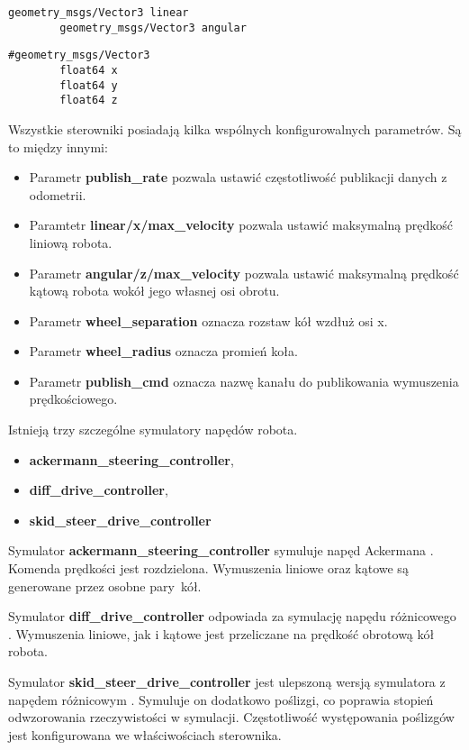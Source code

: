 {{    \vspace{2mm}
    
    \begin{lstlisting}[caption=Format wiadomości wymuszenia prędkościowego]
        geometry_msgs/Vector3 linear
        geometry_msgs/Vector3 angular
    \end{lstlisting}
    
    \begin{lstlisting}[caption=Format wiadomości definiującej wektor]
        #geometry_msgs/Vector3
        float64 x
        float64 y
        float64 z
    \end{lstlisting}
    
    Wszystkie sterowniki posiadają kilka wspólnych konfigurowalnych parametrów. Są to między innymi:
    \begin{itemize}
            \item Parametr \textbf{publish\_rate} pozwala ustawić częstotliwość publikacji danych z odometrii.
            \item Paramtetr \textbf{linear/x/max\_velocity} pozwala ustawić maksymalną prędkość liniową robota.
            \item Parametr \textbf{angular/z/max\_velocity} pozwala ustawić maksymalną prędkość kątową robota wokół jego własnej osi obrotu.
            \item Parametr \textbf{wheel\_separation} oznacza rozstaw kół wzdłuż osi x.
            \item Parametr \textbf{wheel\_radius} oznacza promień koła.
            \item Parametr \textbf{publish\_cmd} oznacza nazwę kanału do publikowania wymuszenia prędkościowego.
        \end{itemize}
    
    Istnieją trzy szczególne symulatory napędów robota.
    \begin{itemize}
            \item \textbf{ackermann\_steering\_controller},
            \item \textbf{diff\_drive\_controller},
            \item \textbf{skid\_steer\_drive\_controller}
    \end{itemize}
    
    Symulator \textbf{ackermann\_steering\_controller} symuluje napęd Ackermana \cite{ackermann_steering_controller}. Komenda prędkości jest rozdzielona. Wymuszenia liniowe oraz kątowe są generowane przez osobne pary~kół.

    Symulator \textbf{diff\_drive\_controller} odpowiada za symulację napędu różnicowego \cite{diff_steering}. Wymuszenia liniowe, jak i kątowe jest przeliczane na prędkość obrotową kół robota.
    
    Symulator \textbf{skid\_steer\_drive\_controller} jest ulepszoną wersją symulatora z napędem różnicowym \cite{skid_steer_drive_controller}. Symuluje on dodatkowo poślizgi, co poprawia stopień odwzorowania rzeczywistości w symulacji. Częstotliwość występowania poślizgów jest konfigurowana we właściwościach sterownika.
    }
}